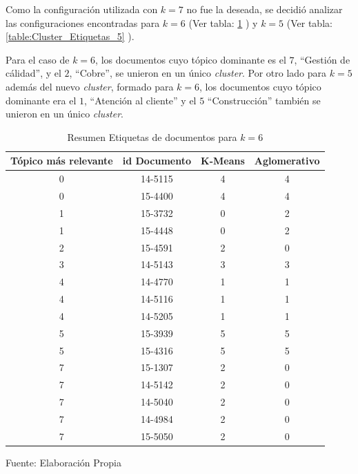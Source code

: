    Como la configuración utilizada con $k=7$ no fue la deseada, se decidió analizar las configuraciones encontradas para $k=6$ (Ver tabla: \ref{table:Cluster_Etiquetas_6} ) y $k=5$ (Ver tabla: \ref{table:Cluster_Etiquetas_5} ). 
   
   Para el caso de $k=6$, los documentos cuyo tópico dominante es el $7$, ``Gestión de cálidad'', y el $2$, ``Cobre'', se unieron en un único \textit{cluster}. Por otro lado para $k=5$ además del nuevo \textit{cluster}, formado para $k=6$, los documentos cuyo tópico dominante era el $1$, ``Atención al cliente'' y el $5$ ``Construcción'' también se unieron en un único \textit{cluster}.
   
    \begin{table}[H]
    \centering
    \begin{tabular}{|c|c|c|c|}
    \hline
    Tópico más relevante & id Documento & K-Means & Aglomerativo \\ \hline
    0                    & 14-5115      & 4       & 4            \\ \hline
    0                    & 15-4400      & 4       & 4            \\ \hline
    1                    & 15-3732      & 0       & 2            \\ \hline
    1                    & 15-4448      & 0       & 2            \\ \hline
    2                    & 15-4591      & 2       & 0            \\ \hline
    3                    & 14-5143      & 3       & 3            \\ \hline
    4                    & 14-4770      & 1       & 1            \\ \hline
    4                    & 14-5116      & 1       & 1            \\ \hline
    4                    & 14-5205      & 1       & 1            \\ \hline
    5                    & 15-3939      & 5       & 5            \\ \hline
    5                    & 15-4316      & 5       & 5            \\ \hline
    7                    & 15-1307      & 2       & 0            \\ \hline
    7                    & 14-5142      & 2       & 0            \\ \hline
    7                    & 14-5040      & 2       & 0            \\ \hline
    7                    & 14-4984      & 2       & 0            \\ \hline
    7                    & 15-5050      & 2       & 0            \\ \hline
    \end{tabular}
    \caption{\label{table:Cluster_Etiquetas_6} Resumen Etiquetas de documentos para $k=6$} Fuente: Elaboración Propia
    \end{table}
    
